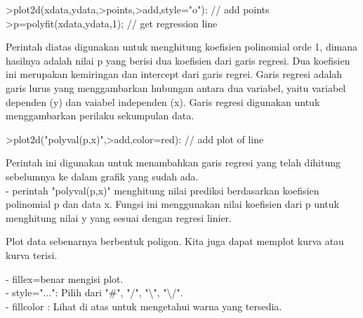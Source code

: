 \documentclass{article}
\begin{document}
\begin{eulernotebook}
\begin{eulercomment}
\begin{eulercomment}
\begin{eulercomment}
\begin{eulercomment}
\begin{eulercomment}
\end{eulercomment}
\begin{eulerprompt}
>plot2d(xdata,ydata,>points,>add,style="o"): // add points
>p=polyfit(xdata,ydata,1); // get regression line
\end{eulerprompt}
\begin{eulercomment}
Perintah diatas digunakan untuk menghitung koefisien polinomial orde
1, dimana hasilnya adalah nilai p yang berisi dua koefisien dari garis
regresi. Dua koefisien ini merupakan kemiringan dan intercept dari
garis regrei. Garis regresi adalah garis lurus yang menggambarkan
hubungan antara dua variabel, yaitu variabel dependen (y) dan vaiabel
independen (x). Garis regresi digunakan untuk menggambarkan perilaku
sekumpulan data.
\end{eulercomment}
\begin{eulerprompt}
>plot2d("polyval(p,x)",>add,color=red): // add plot of line
\end{eulerprompt}
\begin{eulercomment}
Perintah ini digunakan untuk menambahkan garis regresi yang telah
dihitung sebelumnya ke dalam grafik yang sudah ada.\\
- perintah "polyval(p,x)" menghitung nilai prediksi berdasarkan
koefisien polinomial p dan data x. Fungsi ini menggunakan nilai
koefisien dari p untuk menghitung nilai y yang sesuai dengan regresi
linier.

\begin{eulercomment}
\begin{eulercomment}
Plot data sebenarnya berbentuk poligon. Kita juga dapat memplot kurva
atau kurva terisi.

- fillex=benar mengisi plot.\\
- style="...": Pilih dari "#", "/", "\textbackslash{}", "\textbackslash{}/".\\
- fillcolor : Lihat di atas untuk mengetahui warna yang tersedia.


\end{eulercomment}
\end{eulercomment}
\end{eulercomment}
\end{eulercomment}
\end{eulercomment}
\end{eulercomment}
\end{eulercomment}
\end{eulernotebook}
\end{document}
